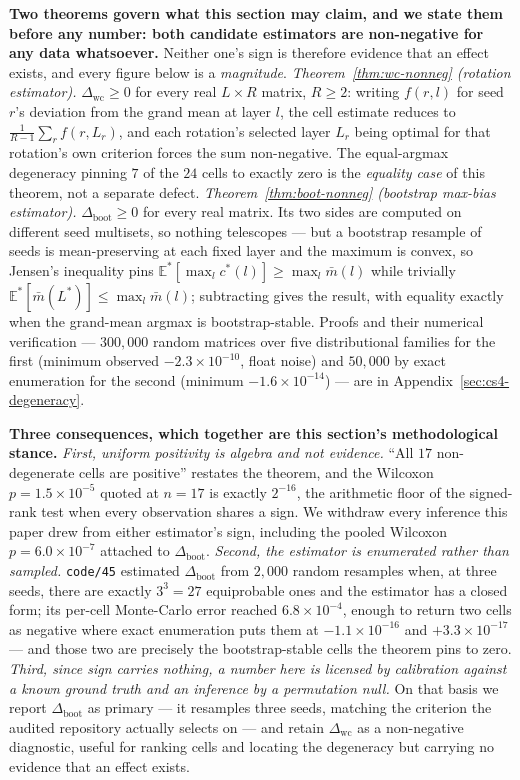 \documentclass[10pt]{article} %
\begin{document}
\textbf{Two theorems govern what this section may claim, and we state them
before any number: both candidate estimators are non-negative for any data
whatsoever.} Neither one's sign is therefore evidence that an effect exists,
and every figure below is a \emph{magnitude}.
\emph{Theorem~\ref{thm:wc-nonneg} (rotation estimator).}
$\Delta_{\text{wc}}\ge0$ for every real $L\times R$ matrix, $R\ge2$: writing
$f(r,l)$ for seed $r$'s deviation from the grand mean at layer $l$, the cell
estimate reduces to $\tfrac{1}{R-1}\sum_r f(r,L_r)$, and each rotation's
selected layer $L_r$ being optimal for that rotation's own criterion forces the
sum non-negative. The equal-argmax degeneracy pinning $7$ of the $24$ cells to
exactly zero is the \emph{equality case} of this theorem, not a separate
defect. \emph{Theorem~\ref{thm:boot-nonneg} (bootstrap max-bias estimator).}
$\Delta_{\text{boot}}\ge0$ for every real matrix. Its two sides are computed on
different seed multisets, so nothing telescopes --- but a bootstrap resample of
seeds is mean-preserving at each fixed layer and the maximum is convex, so
Jensen's inequality pins $\mathbb{E}^{*}[\max_l c^{*}(l)]\ge\max_l\bar m(l)$
while trivially $\mathbb{E}^{*}[\bar m(L^{*})]\le\max_l\bar m(l)$; subtracting
gives the result, with equality exactly when the grand-mean argmax is
bootstrap-stable. Proofs and their numerical verification --- $300{,}000$ random
matrices over five distributional families for the first (minimum observed
$-2.3\times10^{-10}$, float noise) and $50{,}000$ by exact enumeration for the
second (minimum $-1.6\times10^{-14}$) --- are in
Appendix~\ref{sec:cs4-degeneracy}.

\textbf{Three consequences, which together are this section's methodological
stance.} \emph{First, uniform positivity is algebra and not evidence.} ``All
$17$ non-degenerate cells are positive'' restates the theorem, and the Wilcoxon
$p=1.5\times10^{-5}$ quoted at $n=17$ is exactly $2^{-16}$, the arithmetic
floor of the signed-rank test when every observation shares a sign. We withdraw
every inference this paper drew from either estimator's sign, including the
pooled Wilcoxon $p=6.0\times10^{-7}$ attached to $\Delta_{\text{boot}}$.
\emph{Second, the estimator is enumerated rather than sampled.}
\texttt{code/45} estimated $\Delta_{\text{boot}}$ from $2{,}000$ random
resamples when, at three seeds, there are exactly $3^3=27$ equiprobable ones
and the estimator has a closed form; its per-cell Monte-Carlo error reached
$6.8\times10^{-4}$, enough to return two cells as negative where exact
enumeration puts them at $-1.1\times10^{-16}$ and $+3.3\times10^{-17}$ --- and
those two are precisely the bootstrap-stable cells the theorem pins to zero.
\emph{Third, since sign carries nothing, a number here is licensed by
calibration against a known ground truth and an inference by a permutation
null.} On that basis we report $\Delta_{\text{boot}}$ as primary --- it
resamples three seeds, matching the criterion the audited repository actually
selects on --- and retain $\Delta_{\text{wc}}$ as a non-negative diagnostic,
useful for ranking cells and locating the degeneracy but carrying no evidence
that an effect exists.
\end{document}
